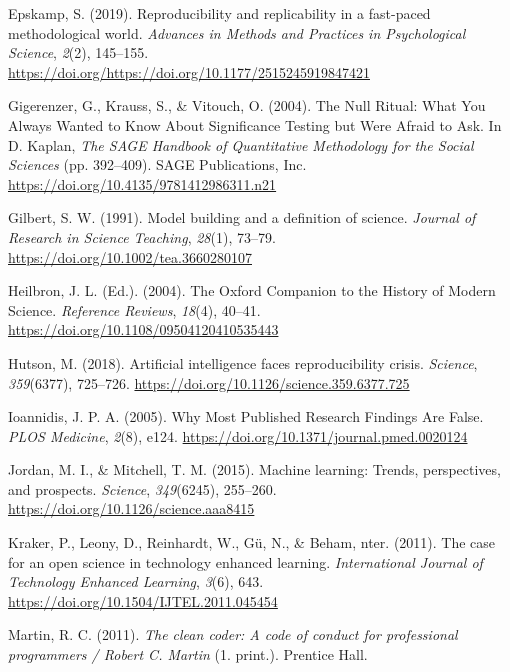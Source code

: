 \documentclass[12pt,a4paper,twoside]{article}
\begin{document}
\leavevmode\hypertarget{ref-epskamp2019rep}{}%
Epskamp, S. (2019). Reproducibility and replicability in a fast-paced methodological world. \emph{Advances in Methods and Practices in Psychological Science}, \emph{2}(2), 145--155. \url{https://doi.org/https://doi.org/10.1177/2515245919847421}

\leavevmode\hypertarget{ref-gigerenzerNullRitualWhat2004}{}%
Gigerenzer, G., Krauss, S., \& Vitouch, O. (2004). The Null Ritual: What You Always Wanted to Know About Significance Testing but Were Afraid to Ask. In D. Kaplan, \emph{The SAGE Handbook of Quantitative Methodology for the Social Sciences} (pp. 392--409). SAGE Publications, Inc. \url{https://doi.org/10.4135/9781412986311.n21}

\leavevmode\hypertarget{ref-gilbertModelBuildingDefinition1991}{}%
Gilbert, S. W. (1991). Model building and a definition of science. \emph{Journal of Research in Science Teaching}, \emph{28}(1), 73--79. \url{https://doi.org/10.1002/tea.3660280107}

\leavevmode\hypertarget{ref-heilbronOxfordCompanionHistory2004}{}%
Heilbron, J. L. (Ed.). (2004). The Oxford Companion to the History of Modern Science. \emph{Reference Reviews}, \emph{18}(4), 40--41. \url{https://doi.org/10.1108/09504120410535443}

\leavevmode\hypertarget{ref-hutsonArtificialIntelligenceFaces2018}{}%
Hutson, M. (2018). Artificial intelligence faces reproducibility crisis. \emph{Science}, \emph{359}(6377), 725--726. \url{https://doi.org/10.1126/science.359.6377.725}

\leavevmode\hypertarget{ref-ioannidisWhyMostPublished2005}{}%
Ioannidis, J. P. A. (2005). Why Most Published Research Findings Are False. \emph{PLOS Medicine}, \emph{2}(8), e124. \url{https://doi.org/10.1371/journal.pmed.0020124}

\leavevmode\hypertarget{ref-jordanMachineLearningTrends2015}{}%
Jordan, M. I., \& Mitchell, T. M. (2015). Machine learning: Trends, perspectives, and prospects. \emph{Science}, \emph{349}(6245), 255--260. \url{https://doi.org/10.1126/science.aaa8415}

\leavevmode\hypertarget{ref-krakerCaseOpenScience2011}{}%
Kraker, P., Leony, D., Reinhardt, W., Gü, N., \& Beham, nter. (2011). The case for an open science in technology enhanced learning. \emph{International Journal of Technology Enhanced Learning}, \emph{3}(6), 643. \url{https://doi.org/10.1504/IJTEL.2011.045454}

\leavevmode\hypertarget{ref-martinCleanCoderCode2011}{}%
Martin, R. C. (2011). \emph{The clean coder: A code of conduct for professional programmers / Robert C. Martin} (1. print.). Prentice Hall.
\end{document}
